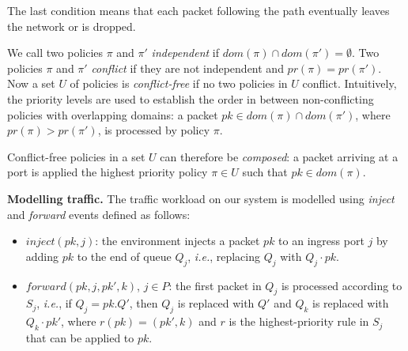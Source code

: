 \documentclass[11pt,pdftex,letter]{article}
\newcommand{\dom}{\textit{dom}}
\newcommand{\pr}{\textit{pr}}
\newcommand{\CPOs}{\textit{paths}}
\newcommand{\ie}{{\it i.e.}}
\newcommand{\mcnote}[1]{\textcolor{heraldBlue}{\small \bf [MC: #1]}}
\newcommand{\ssnote}[1]{\textcolor{heraldBlue}{\small \bf [SS: #1]}}
\newcommand{\mcnote}[1]{}
\newcommand{\ssnote}[1]{}
\begin{document}
The last condition means that each packet following the path
eventually leaves the network or is dropped.

We call two policies $\pi$ and $\pi'$ \emph{independent} if
$\dom(\pi)\cap \dom(\pi')= \emptyset$.
Two policies $\pi$ and $\pi'$ \emph{conflict} if they are not
independent and $\pr(\pi)=\pr(\pi')$.
%
Now a set $U$ of policies is \emph{conflict-free} if
no two policies in $U$ conflict.
Intuitively, the priority levels are used to establish the order in
between non-conflicting policies with overlapping domains: a packet
$pk\in\dom(\pi)\cap \dom(\pi')$, where $\pr(\pi)>\pr(\pi')$,  is
processed by policy $\pi$.

Conflict-free policies in a set $U$ can therefore be \emph{composed}:
a packet arriving at a port is applied the highest priority policy
$\pi\in U$ such that
$\textit{pk}\in\dom(\pi)$.


\vspace{1mm}\noindent\textbf{Modelling traffic.}
%
The traffic workload on our system is modelled using \textit{inject}
and \textit{forward} events defined as follows:
\begin{itemize}
\item $\textit{inject}(pk,j)$: the environment injects a packet $pk$
  to an ingress port $j$ by adding $pk$ to the end of queue $Q_j$,
  \ie, replacing $Q_j$ with $Q_j\cdot pk$.
\item $\textit{forward}(pk,j,pk',k)$, $j \in P$:
  the first packet in $Q_j$ is processed
  according to $S_j$, \ie, if $Q_j=pk.Q'$, then $Q_j$ is
  replaced with $Q'$ and  $Q_k$ is
  replaced with $Q_k\cdot pk'$, where $r(pk)=(pk',k)$ and $r$ is the
  highest-priority rule in $S_j$ that can be applied to $pk$.
\end{itemize}
\end{document}

